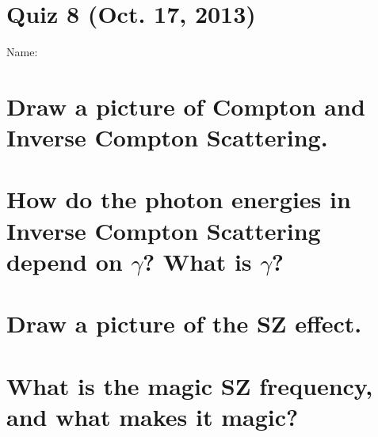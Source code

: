 \documentclass[11pt]{article}
\begin{document}
\pagestyle{empty}
\parindent=0pt

\section*{\centering Quiz 8 (Oct. 17, 2013)}

{\large
Name:\\
}

\section{Draw a picture of Compton and Inverse Compton Scattering.}
\vspace{1.5in}
\section{How do the photon energies in Inverse Compton Scattering depend on $\gamma$?  What is $\gamma$?}
\vspace{1.5in}
\section{Draw a picture of the SZ effect.}
\vspace{1.5in}
\section{What is the magic SZ frequency, and what makes it magic?}
~
\vspace{1.5in}
\end{document}
